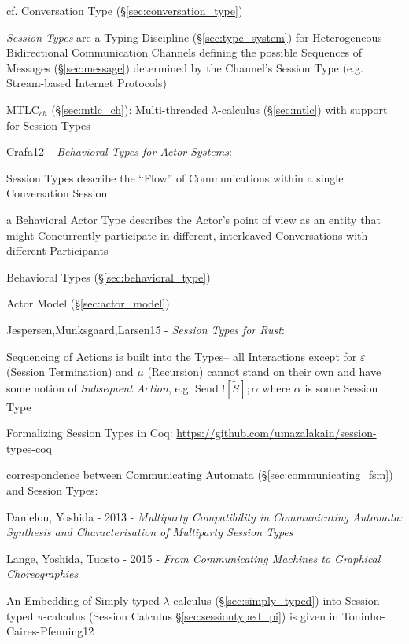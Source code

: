 \fist cf. Conversation Type (\S\ref{sec:conversation_type})

\emph{Session Types} are a Typing Discipline (\S\ref{sec:type_system})
for Heterogeneous Bidirectional Communication Channels defining the
possible Sequences of Messages (\S\ref{sec:message}) determined by the
Channel's Session Type (e.g. Stream-based Internet Protocols)
\cite{neubauer-thiemann04}

\fist MTLC$_{ch}$ (\S\ref{sec:mtlc_ch}): Multi-threaded
$\lambda$-calculus (\S\ref{sec:mtlc}) with support for Session Types

Crafa12 -- \emph{Behavioral Types for Actor Systems}:

Session Types describe the ``Flow'' of Communications within a single
Conversation Session

a Behavioral Actor Type describes the Actor's point of view as an
entity that might Concurrently participate in different, interleaved
Conversations with different Participants

Behavioral Types (\S\ref{sec:behavioral_type})

\fist Actor Model (\S\ref{sec:actor_model})

Jespersen,Munksgaard,Larsen15 - \emph{Session Types for Rust}:

Sequencing of Actions is built into the Types-- all Interactions except for
$\varepsilon$ (Session Termination) and $\mu$ (Recursion) cannot stand on their
own and have some notion of \emph{Subsequent Action}, e.g. Send
$![\tilde{S}];\alpha$ where $\alpha$ is some Session Type

Formalizing Session Types in Coq:
\url{https://github.com/umazalakain/session-types-coq}

\asterism


correspondence between Communicating Automata
(\S\ref{sec:communicating_fsm}) and Session Types:

Danielou, Yoshida - 2013 - \emph{Multiparty Compatibility in
  Communicating Automata: Synthesis and Characterisation of Multiparty
  Session Types}

Lange, Yoshida, Tuosto - 2015 -
\emph{From Communicating Machines to Graphical Choreographies}


\asterism


An Embedding of Simply-typed $\lambda$-calculus
(\S\ref{sec:simply_typed}) into Session-typed $\pi$-calculus (Session
Calculus \S\ref{sec:sessiontyped_pi}) is given in
Toninho-Caires-Pfenning12 \cite{caires-pfenning-toninho12}

